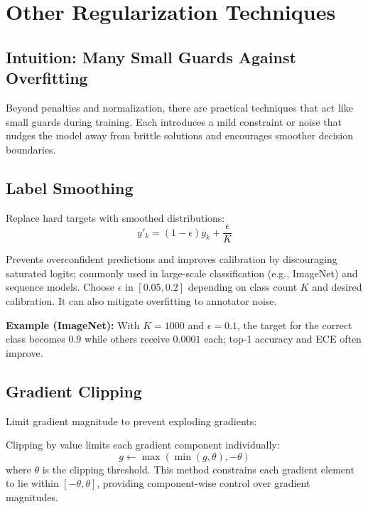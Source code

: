 
\section{Other Regularization Techniques }
\label{sec:other-regularization}

\subsection{Intuition: Many Small Guards Against Overfitting}

Beyond penalties and normalization, there are practical techniques that act like small guards during training. Each introduces a mild constraint or noise that nudges the model away from brittle solutions and encourages smoother decision boundaries.

\subsection{Label Smoothing}

Replace hard targets with smoothed distributions:
\begin{equation}
y'_k = (1 - \epsilon) y_k + \frac{\epsilon}{K}
\end{equation}

Prevents overconfident predictions and improves calibration by discouraging saturated logits; commonly used in large-scale classification (e.g., ImageNet) and sequence models. Choose $\epsilon$ in $[0.05, 0.2]$ depending on class count $K$ and desired calibration. It can also mitigate overfitting to annotator noise.

\begin{example}
\textbf{Example (ImageNet):} With $K=1000$ and $\epsilon=0.1$, the target for the correct class becomes $0.9$ while others receive $0.0001$ each; top-1 accuracy and ECE often improve.
\end{example}

\subsection{Gradient Clipping}

Limit gradient magnitude to prevent exploding gradients:

\begin{definition}
Clipping by value limits each gradient component individually:
\begin{equation}
g \leftarrow \max(\min(g, \theta), -\theta)
\end{equation}
where $\theta$ is the clipping threshold. This method constrains each gradient element to lie within $[-\theta, \theta]$, providing component-wise control over gradient magnitudes.
\end{definition}

